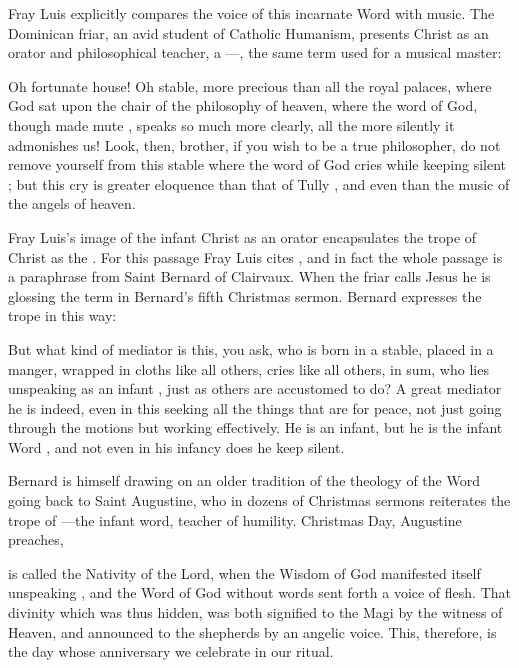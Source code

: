 Fray Luis explicitly compares the voice of this incarnate Word with music.  The
Dominican friar, an avid student of Catholic Humanism, presents Christ as an
orator and philosophical teacher, a ---, the same term used for a musical master:
\begin{quoting}
    Oh fortunate house!
    Oh stable, more precious than all the royal palaces, where God sat upon the
    chair  of the philosophy of heaven, where the word of God,
    though made mute , speaks so much
    more clearly, all the more silently it admonishes us!
    Look, then, brother, if you wish to be a true philosopher, do not remove
    yourself from this stable where the word of God cries while keeping silent
    ;
    but this cry is greater eloquence than that of Tully , and even
    than the music of the angels of heaven.%
        \Autocite[39]{LuisdeGranada:Xmas}
\end{quoting}
Fray Luis's image of the infant Christ as an orator encapsulates the trope of
Christ as the .
For this passage Fray Luis cites , and in fact the whole
passage is a paraphrase from Saint Bernard of Clairvaux.
When the friar calls Jesus  he is
glossing the term  in Bernard's fifth Christmas sermon.
Bernard expresses the trope in this way:
\begin{quoting}
    But what kind of mediator is this, you ask, who is born in a stable, placed
    in a manger, wrapped in cloths like all others, cries like all others, in
    sum, who lies unspeaking as an infant , just as others
    are accustomed to do?
    A great mediator he is indeed, even in this seeking all the things that are
    for peace, not just going through the motions but working effectively.  He
    is an infant, but he is the infant Word , and not
    even in his infancy does he keep silent.%
        \Autocite[128A, Sermo V]{Bernard:Nativitate}
\end{quoting}
Bernard is himself drawing on an older tradition of the theology of the Word
going back to Saint Augustine, who in dozens of Christmas sermons reiterates
the trope of ---the infant word, teacher
of humility.%
    \Autocite[1004, heading for sermon 187]{Augustine:SermonesPL}
Christmas Day, Augustine preaches,
\begin{quoting}
    is called the Nativity of the Lord, when the Wisdom of God manifested
    itself unspeaking , and the Word of God without words
    sent forth a voice of flesh.
    That divinity which was thus hidden, was both signified to the Magi by the
    witness of Heaven, and announced to the shepherds by an angelic voice.
    This, therefore, is the day whose anniversary we celebrate in our ritual.%
        \Autocite[997, Sermo 185, In Natali Domini 2]{Augustine:SermonesPL}
\end{quoting}

